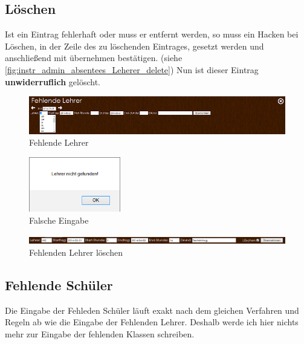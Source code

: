 \subsection{Löschen}
Ist ein Eintrag fehlerhaft oder muss er entfernt werden, so muss ein Hacken bei Löschen, in der Zeile des zu löschenden Eintrages, gesetzt werden und anschließend mit übernehmen bestätigen. (siehe \autoref{fig:instr_admin_absentees_Leherer_delete}) Nun ist dieser Eintrag \textbf{unwiderruflich} gelöscht.
\begin{figure}[H]
\centering
\includegraphics[keepaspectratio=true, width=16cm]{images/screenshots/absentees_teacher.png}
\caption{Fehlende Lehrer}
\label{fig:instr_admin_absentees_Lehrer}
\end{figure}
\begin{figure}[H]
\centering
\includegraphics[keepaspectratio=true, width=4cm]{images/screenshots/input_fail_teacher.png}
\caption{Falsche Eingabe}
\label{fig:instr_admin_absentees_fail}
\end{figure}
\begin{figure}[H]
\centering
\includegraphics[keepaspectratio=true, width=16cm]{images/screenshots/absentees_teacher_delete.png}
\caption{Fehlenden Lehrer löschen}
\label{fig:instr_admin_absentees_Leherer_delete}
\end{figure}
\subsection{Fehlende Schüler}
Die Eingabe der Fehleden Schüler läuft exakt nach dem gleichen Verfahren und Regeln ab wie die Eingabe der Fehlenden Lehrer. Deshalb werde ich hier nichts mehr zur Eingabe der fehlenden Klassen schreiben.
